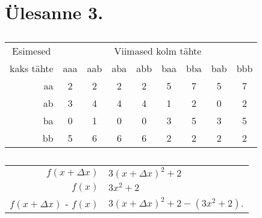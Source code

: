 \section{Ülesanne 3.}

\subsection{}

\begin{center}
  \begin{tabular}{ | r | *{8}{c} | }
    \hline
    \multicolumn{1}{|c|}{Esimesed} & \multicolumn{8}{|c|}{Viimased kolm tähte} \\
    kaks tähte & aaa & aab & aba & abb & baa & bba & bab & bbb \\ \hline
    aa & 2 & 2 & 2 & 2 & 5 & 7 & 5 & 7 \\
    ab & 3 & 4 & 4 & 4 & 1 & 2 & 0 & 2 \\
    ba & 0 & 1 & 0 & 0 & 3 & 5 & 3 & 5 \\
    bb & 5 & 6 & 6 & 6 & 2 & 2 & 2 & 2 \\
    \hline
  \end{tabular}
\end{center}

\subsection{}

\begin{center}
  \begin{tabular}{ r @{ $=$ } l }
					   $f(x+\Delta x)$ & $3(x + \Delta x)^2 + 2$ \\
					            $f(x)$ & $3x^2  + 2$ \\
    \hline
    $f(x+\Delta x)$ - $f(x)$ & $3(x + \Delta x)^2 + 2 - (3x^2  + 2)$.
  \end{tabular}
\end{center}
